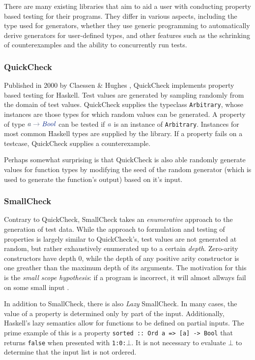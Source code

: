 \documentclass[a4paper,msc,twosized=semi]{uustthesis}
\newcommand*{\mathcolor}{}
\def\mathcolor#1#{\mathcoloraux{#1}}
\newcommand*{\mathcoloraux}[3]{%
  \protect\leavevmode
  \begingroup
    \color#1{#2}#3%
  \endgroup
}
\newcommand{\HSSym}[1]{\mathcolor{hsblue4}{#1}}
\newcommand{\HSCon}[1]{\mathcolor{hsblue3}{\mathit{#1}}}
\newcommand{\HSVar}[1]{\mathcolor{hsblue5}{\mathit{#1}}}
\begin{document}
  There are many existing libraries that aim to aid a user with conducting property 
  based testing for their programs. They differ in various aspects, including the type 
  used for generators, whether they use generic programming to automatically derive 
  generators for user-defined types, and other features such as the schrinking of 
  counterexamples and the ability to concurrently run tests. 

\subsubsection{QuickCheck}

  Published in 2000 by Claessen \& Hughes \cite{claessen2011quickcheck}, QuickCheck 
  implements property based testing for Haskell. Test values are generated by sampling 
  randomly from the domain of test values. QuickCheck supplies the typeclass \texttt
  {Arbitrary}, whose instances are those types for which random values can be 
  generated. A property of type \ensuremath{\HSVar{a}\HSSym{\to} \HSCon{Bool}} can be tested if \ensuremath{\HSVar{a}} is an instance of 
  \texttt{Arbitrary}. Instances for most common Haskell types are supplied by the 
  library. If a property fails on a testcase, QuickCheck supplies a counterexample. 

  Perhaps somewhat surprising is that QuickCheck is also able randomly generate values 
  for function types by modifying the seed of the random generator (which is used to 
  generate the function's output) based on it's input. 

\subsubsection{SmallCheck} 

  Contrary to QuickCheck, SmallCheck \cite{runciman2008smallcheck} takes an \textit
  {enumerative} approach to the generation of test data. While the approach to 
  formulation and testing of properties is largely similar to QuickCheck's, test 
  values are not generated at random, but rather exhaustively enumerated up to a 
  certain \textit{depth}. Zero-arity constructors have depth $0$, while the depth of 
  any positive arity constructor is one greather than the maximum depth of its 
  arguments. The motivation for this is the \textit{small scope hypothesis}: if a 
  program is incorrect, it will almost allways fail on some small input \cite
  {andoni2003evaluating}. 

  In addition to SmallCheck, there is also \textit{Lazy} SmallCheck. In many cases, 
  the value of a property is determined only by part of the input. Additionally, 
  Haskell's lazy semantics allow for functions to be defined on partial inputs. The 
  prime example of this is a property \texttt{sorted :: Ord a => [a] -> Bool} that 
  returns \texttt{false} when presented with \texttt{1:0:$\bot$}. It is not necessary 
  to evaluate $\bot$ to determine that the input list is not ordered. 
\end{document}
